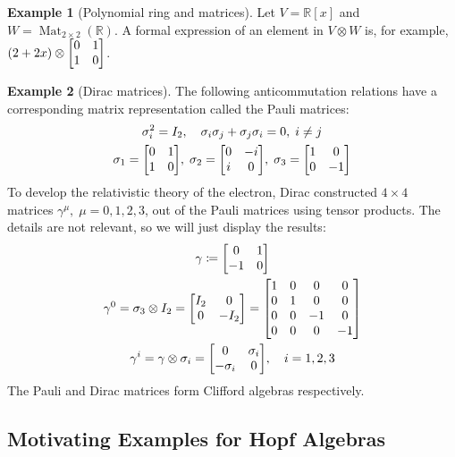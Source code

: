 \documentclass[svgnames]{article}
\theoremstyle{definition}
\newtheorem*{Example*}{Example}
\theoremstyle{remark}
\theoremstyle{underline}
\theoremstyle{underline}
\DeclareMathOperator{\Mat}{Mat}
\begin{document}
	\begin{Example*}[Polynomial ring and matrices] 
		Let $ V = \mathbb{R}[x]$ and $ W = \Mat_{2\times 2}(\mathbb{R})$. A formal expression of an element in $V \otimes W $ is, for example, $(2 + 2x) \otimes \mqty[0 & 1 \\ 1 & 0]$.
	\end{Example*}
	
	\begin{Example*}[Dirac matrices]
		The following anticommutation relations have a corresponding matrix representation called the Pauli matrices:
		\begin{gather*}
		\sigma_i^2 = I_2, \quad \sigma_i \sigma_j + \sigma_j\sigma_i = 0, \; i \neq j \\
		\sigma_1 = \mqty[0 & 1 \\ 1 & 0],\; \sigma_2 = \mqty[0 & -i \\ i & 0],\; \sigma_3 = \mqty[1 & 0 \\ 0 & -1]
		\end{gather*}
		To develop the relativistic theory of the electron, Dirac constructed $4 \times 4$ matrices $\gamma^\mu,\; \mu = 0,1,2,3$, out of the Pauli matrices using tensor products. The details are not relevant, so we will just display the results:
		\begin{gather*}
		\gamma \coloneqq \mqty[0 & 1 \\ -1 & 0] \\
		\gamma^{0} = \sigma_3 \otimes I_2 = \mqty[I_2 & 0 \\ 0 & -I_2] = \mqty[1 & 0 & 0 & 0 \\ 0 & 1 & 0 & 0 \\ 0 & 0 & -1 & 0 \\ 0 & 0 & 0 & -1] \\
		\gamma^{i} = \gamma \otimes \sigma_i = \mqty[0 & \sigma_i \\ -\sigma_i & 0],\quad i = 1,2,3
		\end{gather*}
		The Pauli and Dirac matrices form Clifford algebras respectively.
	\end{Example*}
	
	\subsection{Motivating Examples for Hopf Algebras}
	
\end{document}
